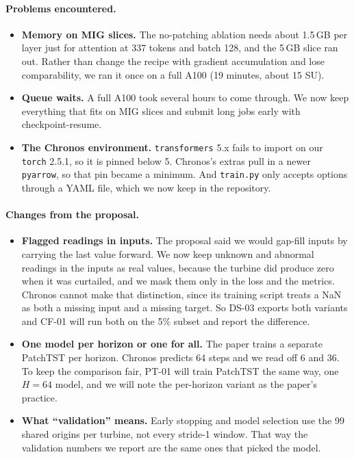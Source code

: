 \documentclass[11pt]{article}
\newcommand{\code}[1]{\texttt{\small #1}}
\begin{document}
\paragraph{Problems encountered.}
\begin{itemize}
  \item \textbf{Memory on MIG slices.} The no-patching ablation needs about 1.5\,GB per layer just for attention
  at 337 tokens and batch 128, and the 5\,GB slice ran out. Rather than change the recipe with gradient
  accumulation and lose comparability, we ran it once on a full A100 (19 minutes, about 15 SU).
  \item \textbf{Queue waits.} A full A100 took several hours to come through. We now keep everything that fits on
  MIG slices and submit long jobs early with checkpoint-resume.
  \item \textbf{The Chronos environment.} \code{transformers} 5.x fails to import on our \code{torch} 2.5.1, so it
  is pinned below 5. Chronos's extras pull in a newer \code{pyarrow}, so that pin became a minimum. And
  \code{train.py} only accepts options through a YAML file, which we now keep in the repository.
\end{itemize}

\paragraph{Changes from the proposal.}
\begin{itemize}
  \item \textbf{Flagged readings in inputs.} The proposal said we would gap-fill inputs by carrying the last value
  forward. We now keep unknown and abnormal readings in the inputs as real values, because the turbine did
  produce zero when it was curtailed, and we mask them only in the loss and the metrics.
  Chronos cannot make that distinction, since its training script treats a NaN as both a missing input and a
  missing target. So DS-03 exports both variants and CF-01 will run both on the 5\% subset and report the
  difference.
  \item \textbf{One model per horizon or one for all.} The paper trains a separate PatchTST per horizon. Chronos
  predicts 64 steps and we read off 6 and 36. To keep the comparison fair, PT-01 will train PatchTST the same way,
  one $H = 64$ model, and we will note the per-horizon variant as the paper's practice.
  \item \textbf{What ``validation'' means.} Early stopping and model selection use the 99 shared origins per
  turbine, not every stride-1 window. That way the validation numbers we report are the same ones that picked the
  model.
\end{itemize}
\end{document}
